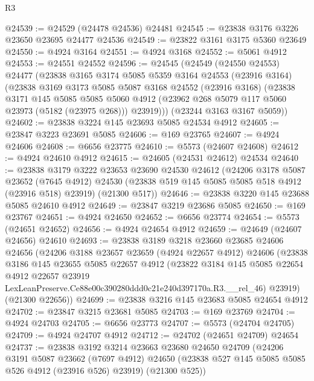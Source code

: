 \begin{lexlean}{R3}
\begin{coremodule}
@24539 := @24529 (@24478 @24536) @24481
@24545 := @23838 @3176 @3226 @23650 @23695 @24477 @24536
@24549 := @23822 @3161 @3175 @5360 @23649
@24550 := @4924 @3164
@24551 := @4924 @3168
@24552 := @5061 @4912
@24553 := @24551 @24552
@24596 := @24545
    (@24549
      (@24550 @24553)
      @24477
      (@23838
        @3165
        @3174
        @5085
        @5359
        @3164
        @24553
        (@23916 @3164)
        (@23838
          @3169
          @3173
          @5085
          @5087
          @3168
          @24552
          (@23916 @3168)
          (@23838
            @3171
            @145
            @5085
            @5085
            @5060
            @4912
            (@23962 @268 @5079 @117 @5060 @23973 (@5182 (@23975 @268)))
            @23919)))
      (@23244 @3163 @3167 @5059))
@24602 := @23838 @3224 @145 @23693 @5085 @24534 @4912
@24605 := @23847 @3223 @23691 @5085
@24606 := @169 @23765
@24607 := @4924 @24606
@24608 := @6656 @23775
@24610 := @5573 (@24607 @24608)
@24612 := @4924 @24610 @4912
@24615 := @24605 (@24531 @24612) @24534
@24640 := @23838
    @3179
    @3222
    @23653
    @23690
    @24530
    @24612
    (@24206
      @3178
      @5087
      @23652
      (@7645 @4912)
      @24530
      (@23838 @519 @145 @5085 @5085 @518 @4912 (@23916 @518) @23919)
      (@21300 @517))
@24646 := @23838 @3220 @145 @23688 @5085 @24610 @4912
@24649 := @23847 @3219 @23686 @5085
@24650 := @169 @23767
@24651 := @4924 @24650
@24652 := @6656 @23774
@24654 := @5573 (@24651 @24652)
@24656 := @4924 @24654 @4912
@24659 := @24649 (@24607 @24656) @24610
@24693 := @23838
    @3189
    @3218
    @23660
    @23685
    @24606
    @24656
    (@24206
      @3188
      @23657
      @23659
      (@4924 @22657 @4912)
      @24606
      (@23838
        @3186
        @145
        @23655
        @5085
        @22657
        @4912
        (@23822
          @3184
          @145
          @5085
          @22654
          @4912
          @22657
          @23919
          LexLeanPreserve.Ce88e00c390280ddd0c21e240d397170a.R3.__rel_46)
        @23919)
      (@21300 @22656))
@24699 := @23838 @3216 @145 @23683 @5085 @24654 @4912
@24702 := @23847 @3215 @23681 @5085
@24703 := @169 @23769
@24704 := @4924 @24703
@24705 := @6656 @23773
@24707 := @5573 (@24704 @24705)
@24709 := @4924 @24707 @4912
@24712 := @24702 (@24651 @24709) @24654
@24737 := @23838
    @3192
    @3214
    @23663
    @23680
    @24650
    @24709
    (@24206
      @3191
      @5087
      @23662
      (@7697 @4912)
      @24650
      (@23838 @527 @145 @5085 @5085 @526 @4912 (@23916 @526) @23919)
      (@21300 @525))

\end{coremodule}
\end{lexlean}
